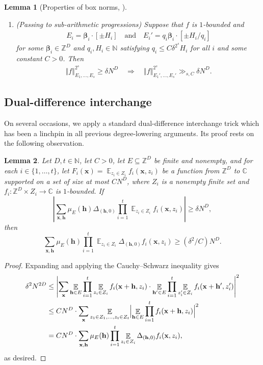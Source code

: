 \documentclass[11pt]{amsart}
\newtheorem{lemma}{Lemma}[section]
\theoremstyle{definition}
\DeclareMathOperator*{\E}{\mathbb{E}}
\newcommand{\C}{{\mathbb C}}
\newcommand{\N}{{\mathbb N}}
\newcommand{\Z}{{\mathbb Z}}
\newcommand{\bh}{{\mathbf{h}}}
\newcommand{\bv}{{\textbf{v}}}
\newcommand{\bx}{{\textbf{x}}}
\newcommand{\bbeta}{{\boldsymbol{\beta}}}
\newcommand{\norm}[1]{\left\Vert #1\right\Vert}
\newcommand{\abs}[1]{\mathopen{}\left| #1\mathclose{}\right|}
\newcommand{\Bigabs}[1]{\Bigl| #1 \Bigr|}
\begin{document}
\begin{lemma}[{Properties of box norms, \cite[Lemma 3.5]{KKL24a}}]
\begin{enumerate}
\begin{align*}
        \norm{f}_{E_1, \ldots, E_s}^{2^s}\geq \delta N^D\quad \Longrightarrow\quad        \norm{f}_{E_1', \ldots, E_s'}^{2^s}\gg_{s}\delta^{2^s}\min(1, \delta^{2^s}/\kappa)^{2s} N^D
    \end{align*}
    for $\kappa = \max_{i}\kappa_{i}.$
    \item\label{i: passing to APs} (Passing to sub-arithmetic progressions) Suppose that  $f$ is $1$-bounded and
    \begin{align*}%
        E_i = \bbeta_{i}\cdot[\pm H_{i}]\quad \textrm{and}\quad E_i' = q_{i}\bbeta_{i}\cdot[\pm H_{i}/q_{i}]
    \end{align*}
    for some $\bbeta_{i}\in \Z^D$ and $q_{i}, H_{i}\in\N$ satisfying $q_{i}\leq C \delta^{2^s}H_{i}$ for all $i$ and some constant $C>0$.
    Then
    \begin{align*}
        \norm{f}_{E_1, \ldots, E_s}^{2^s}\geq \delta N^D \quad \Longrightarrow\quad        \norm{f}_{E_1', \ldots, E_s'}^{2^s}\gg_{s,C} \delta N^D.
    \end{align*}
\end{enumerate}
\end{lemma}

\subsection{Dual-difference interchange}



On several occasions, we apply a standard dual-difference interchange trick which has been a linchpin in all previous degree-lowering arguments. Its proof rests on the following observation.


\begin{lemma}\label{lem:dual-diff preliminary}
Let $D, t\in\N$, let $C>0$, %
let $E\subseteq\Z^D$ be finite and nonempty,
and for each $i\in\{1, \ldots, t\}$, let $F_i(\bx) = \E_{z_i\in Z_i} f_i(\bx, z_i)$ be a function from $\Z^D$ to $\C$ supported on a set of size at most $CN^D$, where $Z_i$ is a nonempty finite set and $f_i: \Z^D \times Z_i \to \mathbb{C}$ is $1$-bounded. 
If
$$\abs{\sum_{\bx, \bh} \mu_E(\bh) \Delta_{(\bh,0)}\prod_{i=1}^t\E_{z_i \in Z_i}f_i(\bx,z_i)} \geq \delta N^D,$$
then
$${\sum_{\bx,\bh} \mu_E(\bh)\prod_{i=1}^t\E_{z_i \in Z_i}\Delta_{(\bh,0)}f_i(\bx,z_i)} \geq (\delta^2/C) N^D.$$
\end{lemma}
\begin{proof}
Expanding and applying the Cauchy--Schwarz inequality gives
\begin{align*}
\delta^2 N^{2D} &\leq 
 \abs{\sum_\bx \E_{\bh\in E} \prod_{i=1}^t\E_{z_i \in Z_i}f_i(\bx+\bh,z_i)\cdot  \E_{\bh'\in E} \prod_{i=1}^t\E_{z'_i \in Z_i}f_i(\bx+\bh',z'_i)}^2\\
 &\leq C N^D \cdot \sum_\bx \E_{z_1 \in Z_1, \ldots, z_t\in Z_t} \Bigabs{\E_{\bh \in E} \prod_{i=1}^t f_i(\bx+\bh,z_i)}^2\\
 &=CN^D \cdot \sum_{\bx, \bh} \mu_E(\bh) \prod_{i=1}^t \E_{z_i \in Z_i} \Delta_{(\bh,0)}f_i(\bx,z_i),
\end{align*}
as desired.
\end{proof}
\end{document}
